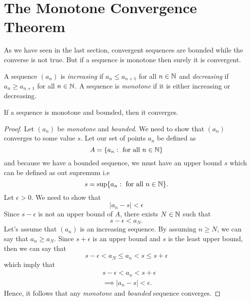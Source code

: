 \section{The Monotone Convergence Theorem}

As we have seen in the last section, convergent sequences are bounded while the converse is not true. But if a sequence is monotone then surely it is convergent. 

\begin{tcolorbox}
\begin{defn}
    A sequence \( (a_n) \) is \textit{increasing } if \( a_n \leq a_{n+1}\) for all \( n \in \mathbb{N} \) and \textit{decreasing} if \( a_n \geq a_{n+1}\) for all \( n \in \mathbb{N} \). A sequence is \textit{monotone} if it is either increasing or decreasing.
\end{defn}
\end{tcolorbox}

\begin{tcolorbox}
    \begin{thm}
        If a sequence is monotone and bounded, then it converges.
    \end{thm}
\end{tcolorbox}

\begin{proof}
Let \( (a_n)\) be \textit{monotone} and \textit{bounded}. We need to show that \( (a_n)\) converges to some value \( s \). Let our set of points \( a_n\) be defined as 
\[ A = \{ a_n : \text{ for all } n \in \mathbb{N}  \}\] 
and because we have a bounded sequence, we must have an upper bound \( s \) which can be defined as out supremum i.e
\[ s = \sup \{ a_n : \text{ for all } n \in \mathbb{N}  \}.\]
Let \( \epsilon > 0 \). We need to show that 
\[ |a_n - s| < \epsilon \] 
Since \( s - \epsilon  \) is not an upper bound of \( A \), there exists \( N \in \mathbb{N} \) such that 
\[ s - \epsilon < a_N.\]
Let's assume that \( (a_n)\) is an increasing sequence. By assuming \(n \geq N \), we can say that \( a_n \geq a_N\). Since \( s + \epsilon \) is an upper bound and \( s \) is the least upper bound, then we can say that  
\[ s - \epsilon < a_N \leq a_n < s \leq s + \epsilon \]
which imply that 
\begin{align*}
    &s - \epsilon  <  a_n < s + \epsilon  \\
    &\implies |a_n - s| < \epsilon.  
\end{align*}
Hence, it follows that any \textit{monotone} and \textit{bounded} sequence converges.
\end{proof}

